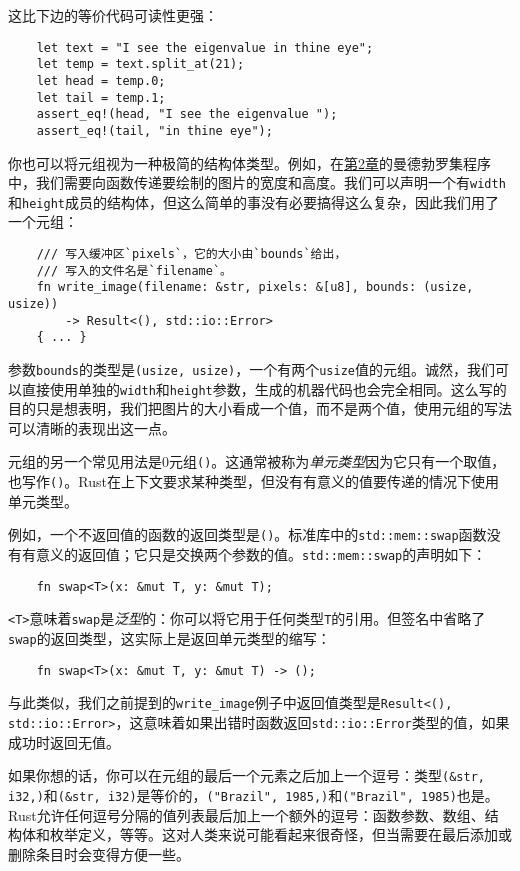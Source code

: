 这比下边的等价代码可读性更强：
\begin{verbatim}
    let text = "I see the eigenvalue in thine eye";
    let temp = text.split_at(21);
    let head = temp.0;
    let tail = temp.1;
    assert_eq!(head, "I see the eigenvalue ");
    assert_eq!(tail, "in thine eye");
\end{verbatim}

你也可以将元组视为一种极简的结构体类型。例如，在\hyperref[ch02]{第2章}的曼德勃罗集程序中，我们需要向函数传递要绘制的图片的宽度和高度。我们可以声明一个有\texttt{width}和\texttt{height}成员的结构体，但这么简单的事没有必要搞得这么复杂，因此我们用了一个元组：
\begin{verbatim}
    /// 写入缓冲区`pixels`，它的大小由`bounds`给出，
    /// 写入的文件名是`filename`。
    fn write_image(filename: &str, pixels: &[u8], bounds: (usize, usize))
        -> Result<(), std::io::Error>
    { ... }
\end{verbatim}

参数\texttt{bounds}的类型是\texttt{(usize, usize)}，一个有两个\texttt{usize}值的元组。诚然，我们可以直接使用单独的\texttt{width}和\texttt{height}参数，生成的机器代码也会完全相同。这么写的目的只是想表明，我们把图片的大小看成一个值，而不是两个值，使用元组的写法可以清晰的表现出这一点。

元组的另一个常见用法是0元组\texttt{()}。这通常被称为\emph{单元类型}因为它只有一个取值，也写作\texttt{()}。Rust在上下文要求某种类型，但没有有意义的值要传递的情况下使用单元类型。

例如，一个不返回值的函数的返回类型是\texttt{()}。标准库中的\texttt{std::mem::swap}函数没有有意义的返回值；它只是交换两个参数的值。\texttt{std::mem::swap}的声明如下：
\begin{verbatim}
    fn swap<T>(x: &mut T, y: &mut T);
\end{verbatim}
\texttt{<T>}意味着\texttt{swap}是\emph{泛型}的：你可以将它用于任何类型\texttt{T}的引用。但签名中省略了\texttt{swap}的返回类型，这实际上是返回单元类型的缩写：
\begin{verbatim}
    fn swap<T>(x: &mut T, y: &mut T) -> ();
\end{verbatim}

与此类似，我们之前提到的\texttt{write\_image}例子中返回值类型是\texttt{Result<(), std::io::Error>}，这意味着如果出错时函数返回\texttt{std::io::Error}类型的值，如果成功时返回无值。

如果你想的话，你可以在元组的最后一个元素之后加上一个逗号：类型\texttt{(\&str, i32,)}和\texttt{(\&str, i32)}是等价的，\texttt{("Brazil", 1985,)}和\texttt{("Brazil", 1985)}也是。Rust允许任何逗号分隔的值列表最后加上一个额外的逗号：函数参数、数组、结构体和枚举定义，等等。这对人类来说可能看起来很奇怪，但当需要在最后添加或删除条目时会变得方便一些。

